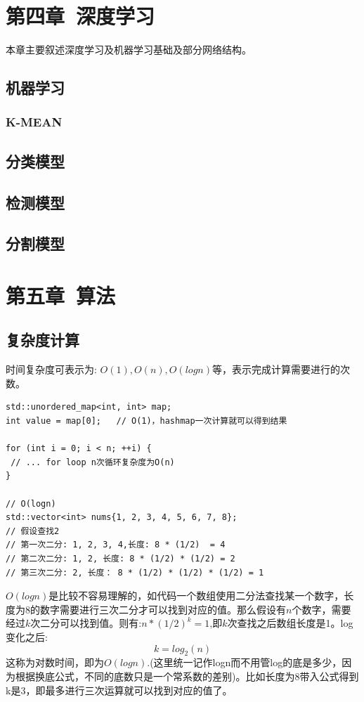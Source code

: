 \documentclass[12pt]{book}
\begin{document}
\fancyhead{}

\chapter{第四章\ 深度学习}
本章主要叙述深度学习及机器学习基础及部分网络结构。

\section{机器学习}
\subsection{K-MEAN}
\section{分类模型}
\section{检测模型}
\section{分割模型}

\newpage

\fancyhead{}

\chapter{第五章\ 算法}
\section{复杂度计算}
时间复杂度可表示为: $O(1), O(n), O(logn)$等，表示完成计算需要进行的次数。
\begin{lstlisting}
std::unordered_map<int, int> map;
int value = map[0];   // O(1)，hashmap一次计算就可以得到结果

for (int i = 0; i < n; ++i) {
 // ... for loop n次循环复杂度为O(n)
}

// O(logn)
std::vector<int> nums{1, 2, 3, 4, 5, 6, 7, 8};
// 假设查找2
// 第一次二分: 1, 2, 3, 4,长度: 8 * (1/2)  = 4
// 第二次二分: 1, 2, 长度: 8 * (1/2) * (1/2) = 2
// 第三次二分: 2, 长度： 8 * (1/2) * (1/2) * (1/2) = 1
\end{lstlisting}
$O(logn)$是比较不容易理解的，如代码一个数组使用二分法查找某一个数字，长度为8的数字需要进行三次二分才可以找到对应的值。那么假设有$n$个数字，需要经过$k$次二分可以找到值。则有:$n * (1/2)^k = 1$,即$k$次查找之后数组长度是1。log变化之后:
\begin{equation}\label{log-algorithm-time}
k = log_2(n)
\end{equation}
这称为对数时间，即为$O(logn)$.(这里统一记作logn而不用管log的底是多少，因为根据换底公式，不同的底数只是一个常系数的差别)。比如长度为8带入公式得到k是3，即最多进行三次运算就可以找到对应的值了。
\end{document}
